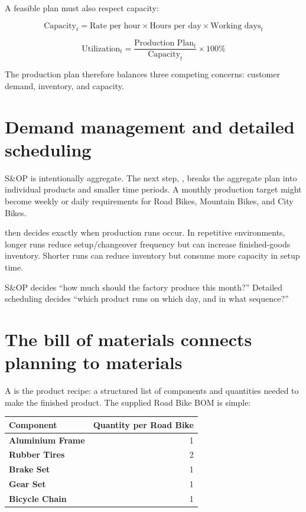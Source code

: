 A feasible plan must also respect capacity:

\[
\text{Capacity}_t = \text{Rate per hour} \times \text{Hours per day} \times \text{Working days}_t
\]

\[
\text{Utilization}_t = \frac{\text{Production Plan}_t}{\text{Capacity}_t}\times 100\%
\]

The production plan therefore balances three competing concerns: customer demand, inventory, and capacity.

\section{Demand management and detailed scheduling}

S\&OP is intentionally aggregate. The next step, , breaks the aggregate plan into individual products and smaller time periods. A monthly production target might become weekly or daily requirements for Road Bikes, Mountain Bikes, and City Bikes.

 then decides exactly when production runs occur. In repetitive environments, longer runs reduce setup/changeover frequency but can increase finished-goods inventory. Shorter runs can reduce inventory but consume more capacity in setup time.

\begin{intuition}
S\&OP decides ``how much should the factory produce this month?'' Detailed scheduling decides ``which product runs on which day, and in what sequence?''
\end{intuition}

\section{The bill of materials connects planning to materials}

A  is the product recipe: a structured list of components and quantities needed to make the finished product. The supplied Road Bike BOM is simple:

\begin{erptable}
\begin{tabularx}{0.72\linewidth}{@{}>{\bfseries\color{ERPNavy}}Xr@{}}
\toprule
\rowcolor{ERPPaleBlue!92}
Component & Quantity per Road Bike \\
\midrule
Aluminium Frame & 1 \\
Rubber Tires & 2 \\
Brake Set & 1 \\
Gear Set & 1 \\
Bicycle Chain & 1 \\
\bottomrule
\end{tabularx}
\end{erptable}

